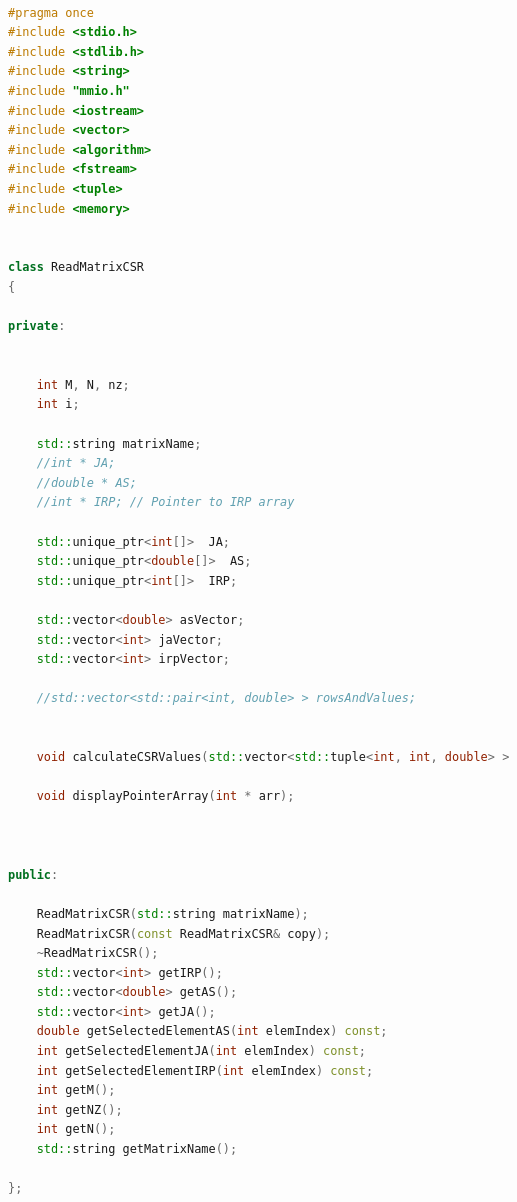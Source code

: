 \documentclass{scrreprt}
\begin{document}
\begin{lstlisting}[language=C++, caption=ReadMatrixCSR.h]

#pragma once
#include <stdio.h>
#include <stdlib.h>
#include <string>
#include "mmio.h"
#include <iostream>
#include <vector>
#include <algorithm>
#include <fstream>
#include <tuple>
#include <memory>


class ReadMatrixCSR
{

private:

	
	int M, N, nz;
	int i;
	
	std::string matrixName;
	//int * JA;
	//double * AS;
	//int * IRP; // Pointer to IRP array

	std::unique_ptr<int[]>  JA;
	std::unique_ptr<double[]>  AS;
	std::unique_ptr<int[]>  IRP;

	std::vector<double> asVector;
	std::vector<int> jaVector;
	std::vector<int> irpVector;

	//std::vector<std::pair<int, double> > rowsAndValues;


	void calculateCSRValues(std::vector<std::tuple<int, int, double> > rowsAndValues, int * J);

	void displayPointerArray(int * arr);

	

public:	

	ReadMatrixCSR(std::string matrixName);
	ReadMatrixCSR(const ReadMatrixCSR& copy);
	~ReadMatrixCSR();
	std::vector<int> getIRP();
	std::vector<double> getAS();
	std::vector<int> getJA();
	double getSelectedElementAS(int elemIndex) const;
	int getSelectedElementJA(int elemIndex) const;
	int getSelectedElementIRP(int elemIndex) const;
	int getM();
	int getNZ();
	int getN();
	std::string getMatrixName();

};





\end{lstlisting}
\end{document}
